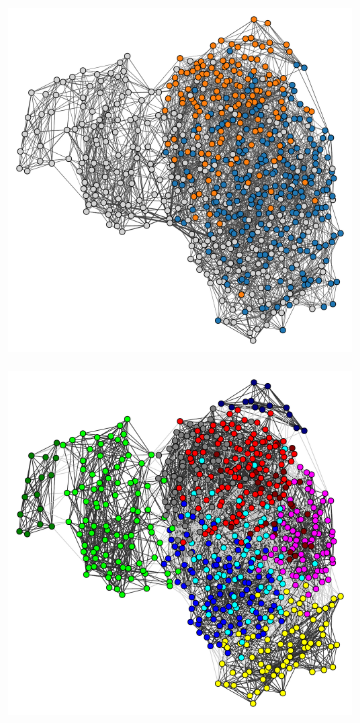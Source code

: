 \begin{figure}[htbp]
  \centering
  \begin{subfigure}[t]{0.5\textwidth}
  \centering
    \includegraphics[width=\linewidth]{graphclust_combined_is20016.pdf}
    \caption{
    }
    \label{fig:graphclustering-combined}
  \end{subfigure}

  \begin{subfigure}[t]{0.5\textwidth}
  \centering
    \includegraphics[width=\linewidth]{graphclust_leiden_is20016.pdf}
    \caption{
    }
    \label{fig:graphclustering-leiden}
  \end{subfigure}


\end{figure}
